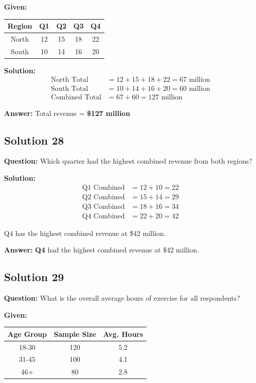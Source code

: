 \documentclass[12pt,a4paper]{article}
\begin{document}
\textbf{Given:}
\begin{center}
\begin{tabular}{|c|c|c|c|c|}
\hline
Region & Q1 & Q2 & Q3 & Q4 \\
\hline
North & 12 & 15 & 18 & 22 \\
South & 10 & 14 & 16 & 20 \\
\hline
\end{tabular}
\end{center}

\textbf{Solution:}
\begin{align*}
\text{North Total} &= 12 + 15 + 18 + 22 = 67 \text{ million} \\
\text{South Total} &= 10 + 14 + 16 + 20 = 60 \text{ million} \\
\text{Combined Total} &= 67 + 60 = 127 \text{ million}
\end{align*}

\textbf{Answer:} Total revenue = \textbf{\$127 million}

\subsection*{Solution 28}
\textbf{Question:} Which quarter had the highest combined revenue from both regions?

\textbf{Solution:}
\begin{align*}
\text{Q1 Combined} &= 12 + 10 = 22 \\
\text{Q2 Combined} &= 15 + 14 = 29 \\
\text{Q3 Combined} &= 18 + 16 = 34 \\
\text{Q4 Combined} &= 22 + 20 = 42
\end{align*}

Q4 has the highest combined revenue at \$42 million.

\textbf{Answer:} \textbf{Q4} had the highest combined revenue at \$42 million.

\subsection*{Solution 29}
\textbf{Question:} What is the overall average hours of exercise for all respondents?

\textbf{Given:}
\begin{center}
\begin{tabular}{|c|c|c|}
\hline
Age Group & Sample Size & Avg. Hours \\
\hline
18-30 & 120 & 5.2 \\
31-45 & 100 & 4.1 \\
46+ & 80 & 2.8 \\
\hline
\end{tabular}
\end{center}
\end{document}
